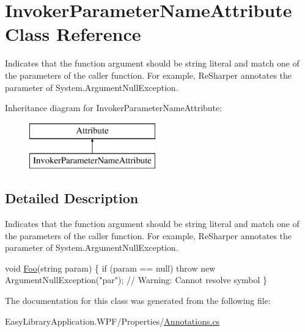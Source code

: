 \hypertarget{class_invoker_parameter_name_attribute}{}\section{Invoker\+Parameter\+Name\+Attribute Class Reference}
\label{class_invoker_parameter_name_attribute}


Indicates that the function argument should be string literal and match one of the parameters of the caller function. For example, Re\+Sharper annotates the parameter of System.\+Argument\+Null\+Exception.  


Inheritance diagram for Invoker\+Parameter\+Name\+Attribute\+:\begin{figure}[H]
\begin{center}
\leavevmode
\includegraphics[height=2.000000cm]{class_invoker_parameter_name_attribute}
\end{center}
\end{figure}


\subsection{Detailed Description}
Indicates that the function argument should be string literal and match one of the parameters of the caller function. For example, Re\+Sharper annotates the parameter of System.\+Argument\+Null\+Exception. 


\begin{DoxyCode}
\textcolor{keywordtype}{void} \mbox{\hyperlink{_annotations_8cs_a710c2378b43f44cd4a9b365c85be5d6c}{Foo}}(\textcolor{keywordtype}{string} param) \{
  \textcolor{keywordflow}{if} (param == null)
    \textcolor{keywordflow}{throw} \textcolor{keyword}{new} ArgumentNullException(\textcolor{stringliteral}{"par"}); \textcolor{comment}{// Warning: Cannot resolve symbol}
\}
\end{DoxyCode}


The documentation for this class was generated from the following file\+:\begin{DoxyCompactItemize}
\item 
Easy\+Library\+Application.\+W\+P\+F/\+Properties/\mbox{\hyperlink{_annotations_8cs}{Annotations.\+cs}}\end{DoxyCompactItemize}
